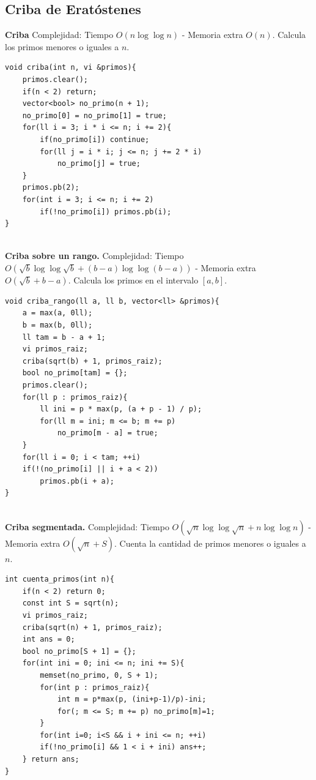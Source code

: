 \documentclass[10pt,spanish,mexico]{article}
\numberwithin{equation}{section}
\begin{document}
\begin{multicols}{2}
\subsection{Criba de Eratóstenes}
\textbf{Criba} Complejidad: Tiempo $O(n\log \log n)$ - Memoria extra $O(n)$. Calcula los primos menores o iguales a $n$.
\begin{verbatim}
void criba(int n, vi &primos){
    primos.clear();
    if(n < 2) return;
    vector<bool> no_primo(n + 1);
    no_primo[0] = no_primo[1] = true;
    for(ll i = 3; i * i <= n; i += 2){
        if(no_primo[i]) continue;
        for(ll j = i * i; j <= n; j += 2 * i)
            no_primo[j] = true;
    }
    primos.pb(2);
    for(int i = 3; i <= n; i += 2)
        if(!no_primo[i]) primos.pb(i);
}
\end{verbatim}

\vspace{-1.2\baselineskip}
\hrulefill\\
\textbf{Criba sobre un rango.} Complejidad: Tiempo $O(\sqrt{b} \log \log \sqrt{b} + (b - a)\log \log(b - a))$ - Memoria extra $O(\sqrt{b} + b - a)$. Calcula los primos en el intervalo $[a, b]$.
\begin{verbatim}
void criba_rango(ll a, ll b, vector<ll> &primos){
    a = max(a, 0ll);
    b = max(b, 0ll);
    ll tam = b - a + 1;
    vi primos_raiz;
    criba(sqrt(b) + 1, primos_raiz);
    bool no_primo[tam] = {};
    primos.clear();
    for(ll p : primos_raiz){
        ll ini = p * max(p, (a + p - 1) / p);
        for(ll m = ini; m <= b; m += p)
            no_primo[m - a] = true;
    }
    for(ll i = 0; i < tam; ++i)
    if(!(no_primo[i] || i + a < 2))
        primos.pb(i + a);
}
\end{verbatim}

\vspace{-1.2\baselineskip}
\hrulefill\\
\textbf{Criba segmentada.} Complejidad: Tiempo $O(\sqrt{n}\log \log \sqrt{n} + n\log \log n)$ - Memoria extra $O(\sqrt{n} + S)$. Cuenta la cantidad de primos menores o iguales a $n$.
\begin{verbatim}
int cuenta_primos(int n){
    if(n < 2) return 0;
    const int S = sqrt(n);
    vi primos_raiz;
    criba(sqrt(n) + 1, primos_raiz);
    int ans = 0;
    bool no_primo[S + 1] = {};
    for(int ini = 0; ini <= n; ini += S){
        memset(no_primo, 0, S + 1);
        for(int p : primos_raiz){
            int m = p*max(p, (ini+p-1)/p)-ini;
            for(; m <= S; m += p) no_primo[m]=1;
        }
        for(int i=0; i<S && i + ini <= n; ++i)
        if(!no_primo[i] && 1 < i + ini) ans++;
    } return ans;
}
\end{verbatim}


\end{multicols}
\end{document}
